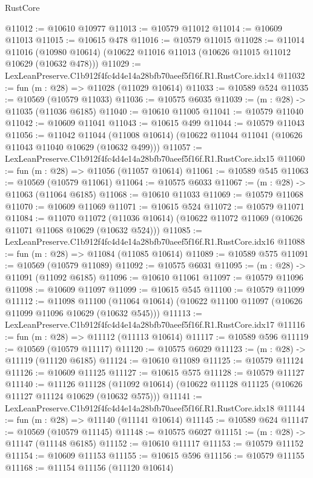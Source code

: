 \begin{lexlean}{RustCore}
\begin{coremodule}
@11012 := @10610 @10977
@11013 := @10579 @11012
@11014 := @10609 @11013
@11015 := @10615 @478
@11016 := @10579 @11015
@11028 := @11014
    @11016
    (@10980 @10614)
    (@10622 @11016 @11013 (@10626 @11015 @11012 @10629 (@10632 @478)))
@11029 := LexLeanPreserve.C1b912f4fc4d4e14a28bfb70aeef5f16f.R1.RustCore.idx14
@11032 := fun (m : @28) => @11028 (@11029 @10614)
@11033 := @10589 @524
@11035 := @10569 (@10579 @11033)
@11036 := @10575 @6035
@11039 := (m : @28) -> @11035 (@11036 @6185)
@11040 := @10610 @11005
@11041 := @10579 @11040
@11042 := @10609 @11041
@11043 := @10615 @499
@11044 := @10579 @11043
@11056 := @11042
    @11044
    (@11008 @10614)
    (@10622 @11044 @11041 (@10626 @11043 @11040 @10629 (@10632 @499)))
@11057 := LexLeanPreserve.C1b912f4fc4d4e14a28bfb70aeef5f16f.R1.RustCore.idx15
@11060 := fun (m : @28) => @11056 (@11057 @10614)
@11061 := @10589 @545
@11063 := @10569 (@10579 @11061)
@11064 := @10575 @6033
@11067 := (m : @28) -> @11063 (@11064 @6185)
@11068 := @10610 @11033
@11069 := @10579 @11068
@11070 := @10609 @11069
@11071 := @10615 @524
@11072 := @10579 @11071
@11084 := @11070
    @11072
    (@11036 @10614)
    (@10622 @11072 @11069 (@10626 @11071 @11068 @10629 (@10632 @524)))
@11085 := LexLeanPreserve.C1b912f4fc4d4e14a28bfb70aeef5f16f.R1.RustCore.idx16
@11088 := fun (m : @28) => @11084 (@11085 @10614)
@11089 := @10589 @575
@11091 := @10569 (@10579 @11089)
@11092 := @10575 @6031
@11095 := (m : @28) -> @11091 (@11092 @6185)
@11096 := @10610 @11061
@11097 := @10579 @11096
@11098 := @10609 @11097
@11099 := @10615 @545
@11100 := @10579 @11099
@11112 := @11098
    @11100
    (@11064 @10614)
    (@10622 @11100 @11097 (@10626 @11099 @11096 @10629 (@10632 @545)))
@11113 := LexLeanPreserve.C1b912f4fc4d4e14a28bfb70aeef5f16f.R1.RustCore.idx17
@11116 := fun (m : @28) => @11112 (@11113 @10614)
@11117 := @10589 @596
@11119 := @10569 (@10579 @11117)
@11120 := @10575 @6029
@11123 := (m : @28) -> @11119 (@11120 @6185)
@11124 := @10610 @11089
@11125 := @10579 @11124
@11126 := @10609 @11125
@11127 := @10615 @575
@11128 := @10579 @11127
@11140 := @11126
    @11128
    (@11092 @10614)
    (@10622 @11128 @11125 (@10626 @11127 @11124 @10629 (@10632 @575)))
@11141 := LexLeanPreserve.C1b912f4fc4d4e14a28bfb70aeef5f16f.R1.RustCore.idx18
@11144 := fun (m : @28) => @11140 (@11141 @10614)
@11145 := @10589 @624
@11147 := @10569 (@10579 @11145)
@11148 := @10575 @6027
@11151 := (m : @28) -> @11147 (@11148 @6185)
@11152 := @10610 @11117
@11153 := @10579 @11152
@11154 := @10609 @11153
@11155 := @10615 @596
@11156 := @10579 @11155
@11168 := @11154
    @11156
    (@11120 @10614)

\end{coremodule}
\end{lexlean}
